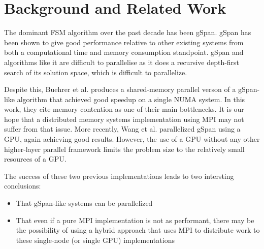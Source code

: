 \section{Background and Related Work}
\label{sec:background}

The dominant FSM algorithm over the past decade has been gSpan\cite{gspan}. 
gSpan has been shown to give good performance relative to other existing
systems from both a computational time and memory consumption standpoint.
gSpan and algorithms like it are difficult to parallelise as it does a 
recursive depth-first search of its solution space, which is difficult to 
parallelize.  

Despite this, Buehrer et al. produces a shared-memory
parallel verson of a gSpan-like algorithm that achieved good speedup on a 
single NUMA system\cite{buehrer2005parallel}.  In this work, they cite 
memory contention as one of their main bottlenecks. It is our hope that
a distributed memory systems implementation using MPI may not suffer
from that issue.  More recently, Wang et al. parallelized gSpan using a 
GPU\cite{gspancuda}, again achieving good results.  However, the use of a 
GPU without any other higher-layer parallel framework limits the problem
size to the relatively small resources of a GPU. 

The success of these two previous implementations leads to two intersting
conclusions:
\begin{itemize}
	\item{That gSpan-like systems can be parallelized}
	\item{That even if a pure MPI implementation is not as performant, 
		there may be the possibility of using a hybrid approach
		that uses MPI to distribute work to these single-node 
		(or single GPU) implementations}
\end{itemize}

